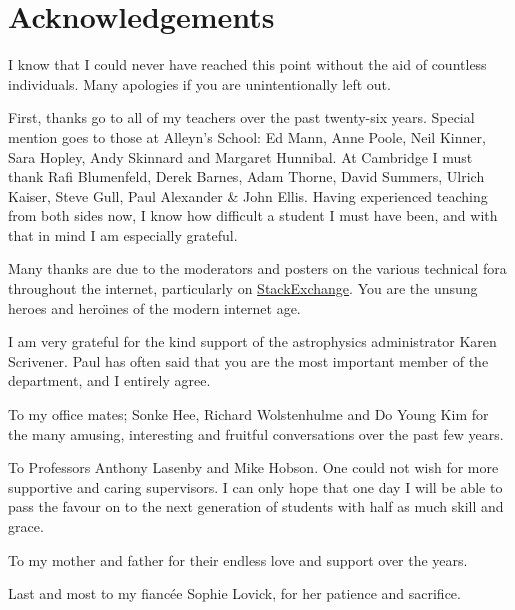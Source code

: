 \chapter{Acknowledgements}

I know that I could never have reached this point without the aid of countless individuals. Many apologies if you are unintentionally left out.

First, thanks go to all of my teachers over the past twenty-six years. Special mention goes to those at Alleyn's School: Ed Mann, Anne Poole, Neil Kinner, Sara Hopley, Andy Skinnard and Margaret Hunnibal. At Cambridge I must thank Rafi Blumenfeld, Derek Barnes, Adam Thorne, David Summers, Ulrich Kaiser, Steve Gull, Paul Alexander \& John Ellis. Having experienced teaching from both sides now, I know how difficult a student I must have been, and with that in mind I am especially grateful.

Many thanks are due to the moderators and posters on the various technical fora throughout the internet, particularly on \mbox{\href{http://stackexchange.com/}{StackExchange}}. You are the unsung heroes and hero\"{\i}nes of the modern internet age.

I am very grateful for the kind support of the astrophysics administrator Karen Scrivener. Paul has often said that you are the most important member of the department, and I entirely agree.

To my office mates; Sonke Hee, Richard Wolstenhulme and Do Young Kim for the many amusing, interesting and fruitful conversations over the past few years. 

To Professors Anthony Lasenby and Mike Hobson. One could not wish for more supportive and caring supervisors. I can only hope that one day I will be able to pass the favour on to the next generation of students with half as much skill and grace.

To my mother and father for their endless love and support over the years. 

Last and most to my fianc\'{e}e Sophie Lovick, for her patience and sacrifice. 


\cleardoublepage{}
